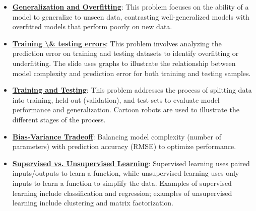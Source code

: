 \documentclass{article}%
\begin{document}
\begin{itemize}[leftmargin=*]
\item \href{https://purdue.brightspace.com/d2l/common/assets/pdfjs-d2l-dist/1.0.14-legacy/web/viewer.html?file=\%2Fcontent\%2Fenforced\%2F1095467-wl.202510.CS.24300.001\%2F10L1-CrossValidation.pdf\%3Fou\%3D1095467\&lang=en-us\&container=d2l-fileviewer-rendered-pdf\&fullscreen=d2l-fileviewer-rendered-pdf-dialog\&height=667#page=2}{\textbf{Generalization and Overfitting}}: This problem focuses on the ability of a model to generalize to unseen data, contrasting well-generalized models with overfitted models that perform poorly on new data.%
\item \href{https://purdue.brightspace.com/d2l/common/assets/pdfjs-d2l-dist/1.0.14-legacy/web/viewer.html?file=\%2Fcontent\%2Fenforced\%2F1095467-wl.202510.CS.24300.001\%2F10L1-CrossValidation.pdf\%3Fou\%3D1095467\&lang=en-us\&container=d2l-fileviewer-rendered-pdf\&fullscreen=d2l-fileviewer-rendered-pdf-dialog\&height=667#page=4}{\textbf{Training \textbackslash{}& testing errors}}: This problem involves analyzing the prediction error on training and testing datasets to identify overfitting or underfitting. The slide uses graphs to illustrate the relationship between model complexity and prediction error for both training and testing samples.%
\item \href{https://purdue.brightspace.com/d2l/common/assets/pdfjs-d2l-dist/1.0.14-legacy/web/viewer.html?file=\%2Fcontent\%2Fenforced\%2F1095467-wl.202510.CS.24300.001\%2F10L1-CrossValidation.pdf\%3Fou\%3D1095467\&lang=en-us\&container=d2l-fileviewer-rendered-pdf\&fullscreen=d2l-fileviewer-rendered-pdf-dialog\&height=667#page=5}{\textbf{Training and Testing}}: This problem addresses the process of splitting data into training, held-out (validation), and test sets to evaluate model performance and generalization. Cartoon robots are used to illustrate the different stages of the process.%
\item \href{https://purdue.brightspace.com/d2l/common/assets/pdfjs-d2l-dist/1.0.14-legacy/web/viewer.html?file=\%2Fcontent\%2Fenforced\%2F1095467-wl.202510.CS.24300.001\%2F11L2-svd-pca-recommender.pdf\%3Fou\%3D1095467\&lang=en-us\&container=d2l-fileviewer-rendered-pdf\&fullscreen=d2l-fileviewer-rendered-pdf-dialog\&height=667#page=53}{\textbf{Bias-Variance Tradeoff}}: Balancing model complexity (number of parameters) with prediction accuracy (RMSE) to optimize performance.%
\item \href{https://purdue.brightspace.com/d2l/common/assets/pdfjs-d2l-dist/1.0.14-legacy/web/viewer.html?file=\%2Fcontent\%2Fenforced\%2F1095467-wl.202510.CS.24300.001\%2F12L2-distance-clusters.pdf\%3Fou\%3D1095467\&lang=en-us\&container=d2l-fileviewer-rendered-pdf\&fullscreen=d2l-fileviewer-rendered-pdf-dialog\&height=667#page=3}{\textbf{Supervised vs. Unsupervised Learning}}: Supervised learning uses paired inputs/outputs to learn a function, while unsupervised learning uses only inputs to learn a function to simplify the data. Examples of supervised learning include classification and regression; examples of unsupervised learning include clustering and matrix factorization.%
\end{itemize}
\end{document}
